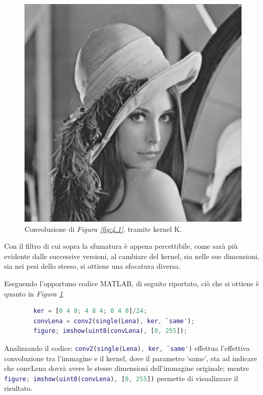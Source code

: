 \documentclass{subfiles}
\begin{document}
\begin{figure}
    \centering
    \includegraphics[scale = 0.25]{../Images/MeanConvolutionLena.png}
    \caption{Convoluzione di \emph{Figura \ref{fig:4.1}}, tramite kernel K.}
    \label{fig:4.2}
\end{figure}
\begin{Remark*}
    Con il filtro di cui sopra la sfumatura è appena percettibile, come sarà più evidente dalle successive versioni,
    al cambiare del kernel, sia nelle sue dimensioni, sia nei pesi dello stesso, si ottiene una sfocatura diversa.
\end{Remark*}

\noindent Eseguendo l'opportuno codice MATLAB, di seguito riportato, ciò che si ottiene è quanto in \emph{Figura \ref{fig:4.2}}.
\begin{center}
    \begin{lstlisting}[language = MATLAB]
        % si aggiunge l'immagine trascinandola in MATLAB
        ker = [0 4 0; 4 8 4; 0 4 0]/24;
        convLena = conv2(single(Lena), ker, `same');
        figure; imshow(uint8(convLena), [0, 255]);
    \end{lstlisting}
\end{center}

\noindent Analizzando il codice: \lstinline[language = MATLAB]{conv2(single(Lena), ker, `same')} effettua l'effettiva convoluzione tra l'immagine e il kernel,
dove il parametro `same', sta ad indicare che convLena dovrà avere le stesse dimensioni dell'immagine originale;
mentre \lstinline[language = MATLAB]{figure; imshow(uint8(convLena), [0, 255])} permette di visualizzare il risultato.
\end{document}

